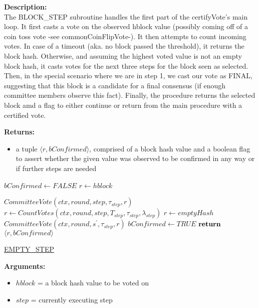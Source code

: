 \documentclass[10pt,a4paper]{article}
\begin{document}
\noindent \textbf{Description:}\\
The BLOCK\_STEP subroutine handles the first part of the certifyVote's main loop.
It first casts a vote on the observed hblock value (possibly coming off of a coin toss vote -see commonCoinFlipVote-).
It then attempts to count incoming votes. In case of a timeout (aka. no block passed the threshold), it returns the block hash.
Otherwise, and assuming the highest voted value is not an empty block hash, it casts votes for the next three steps for the block seen as selected.
Then, in the special scenario where we are in step 1, we cast our vote as FINAL, suggesting that this block is a candidate for a final consensus (if enough committee members observe this fact).
Finally, the procedure returns the selected block amd a flag to either continue or return from the main procedure with a certified vote.

\noindent \textbf{Returns:}
\begin{itemize}
    \item a tuple $\langle r, bConfirmed \rangle$, comprised of a block hash value and a boolean flag to assert whether the given value was
    observed to be confirmed in any way or if further steps are needed
  \end{itemize}

\begin{algorithm}
    \begin{algorithmic}[H]
        \State $bConfirmed \gets FALSE$
        \State $r \gets hblock$

    \State $CommitteeVote(ctx, round, step, \tau_{step}, r)$
    \State $r \gets CountVotes(ctx,round,step,T_{step},\tau_{step},\lambda_{step})$
        \State $r \gets emptyHash$
            \State $CommitteeVote(ctx, round, s^\prime, \tau_{step}, r)$
        \EndFor
        \State $bConfirmed \gets TRUE$
    \EndIf
    $\Return$ $\langle r, bConfirmed \rangle$
    \EndFunction
    \end{algorithmic}
    \caption{\underline{EMPTY\_STEP}}
\end{algorithm}

\noindent \textbf{Arguments:}
\begin{itemize}
    \item $hblock$ = a block hash value to be voted on
    \item $step$ = currently executing step
  \end{itemize}
\end{document}
